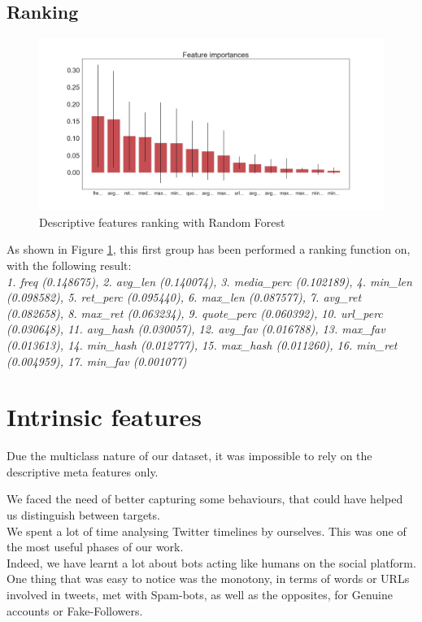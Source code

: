 \subsection{Ranking}
\begin{figure}[htp!]
	\centering
	\includegraphics[width=\columnwidth]{chapter4/figure/desc_features_importances.png}
	\caption{Descriptive features ranking with Random Forest}
	\label{fig:desc_rank}
\end{figure}
As shown in Figure \ref{fig:desc_rank}, this first group has been performed a ranking function on, with the following result:\\
\textit{1. freq (0.148675), 2. avg\_len (0.140074), 3. media\_perc (0.102189), 4. min\_len (0.098582), 5. ret\_perc (0.095440), 6. max\_len (0.087577), 7. avg\_ret (0.082658), 8. max\_ret (0.063234), 9. quote\_perc (0.060392), 10. url\_perc (0.030648), 11. avg\_hash (0.030057), 12. avg\_fav (0.016788), 13. max\_fav (0.013613), 14. min\_hash (0.012777), 15. max\_hash (0.011260), 16. min\_ret (0.004959), 17. min\_fav (0.001077)}



\section{Intrinsic features}
Due the multiclass nature of our dataset, it was impossible to rely on the descriptive meta features only.

We faced the need of better capturing some behaviours, that could have helped us distinguish between targets.\\
We spent a lot of time analysing Twitter timelines by ourselves. This was one of the most useful phases of our work.\\
Indeed, we have learnt a lot about bots acting like humans on the social platform.
One thing that was easy to notice was the monotony, in terms of words or URLs involved in tweets, met with Spam-bots, as well as the opposites, for Genuine accounts or Fake-Followers.

